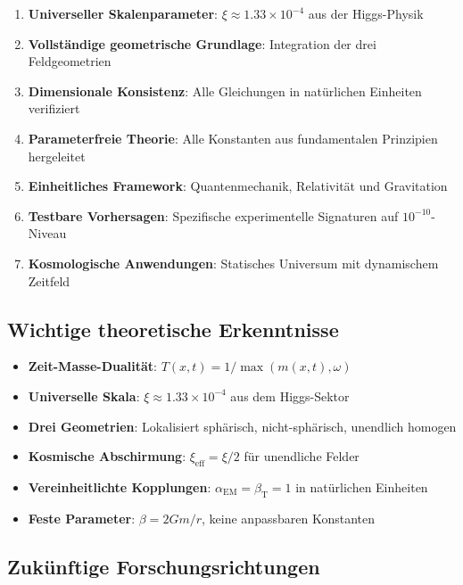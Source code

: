\documentclass[12pt,a4paper]{article}
\newcommand{\betaT}{\beta_{\text{T}}}
\newcommand{\alphaEM}{\alpha_{\text{EM}}}
\newcommand{\xipar}{\xi}
\theoremstyle{definition}
\theoremstyle{remark}
\begin{document}
	\begin{enumerate}
		\item \textbf{Universeller Skalenparameter}: $\xi \approx 1.33 \times 10^{-4}$ aus der Higgs-Physik
		\item \textbf{Vollständige geometrische Grundlage}: Integration der drei Feldgeometrien
		\item \textbf{Dimensionale Konsistenz}: Alle Gleichungen in natürlichen Einheiten verifiziert
		\item \textbf{Parameterfreie Theorie}: Alle Konstanten aus fundamentalen Prinzipien hergeleitet
		\item \textbf{Einheitliches Framework}: Quantenmechanik, Relativität und Gravitation
		\item \textbf{Testbare Vorhersagen}: Spezifische experimentelle Signaturen auf $10^{-10}$-Niveau
		\item \textbf{Kosmologische Anwendungen}: Statisches Universum mit dynamischem Zeitfeld
	\end{enumerate}
	
	\subsection{Wichtige theoretische Erkenntnisse}
	\label{subsec:wichtige_erkenntnisse}
	
	\begin{tcolorbox}[colback=green!5!white,colframe=green!75!black,title=T0-Modell: Zentrale mathematische Ergebnisse]
		\begin{itemize}
			\item \textbf{Zeit-Masse-Dualität}: $T(x,t) = 1/\max(m(x,t), \omega)$
			\item \textbf{Universelle Skala}: $\xipar \approx 1.33 \times 10^{-4}$ aus dem Higgs-Sektor
			\item \textbf{Drei Geometrien}: Lokalisiert sphärisch, nicht-sphärisch, unendlich homogen
			\item \textbf{Kosmische Abschirmung}: $\xi_{\text{eff}} = \xipar/2$ für unendliche Felder
			\item \textbf{Vereinheitlichte Kopplungen}: $\alphaEM = \betaT = 1$ in natürlichen Einheiten
			\item \textbf{Feste Parameter}: $\beta = 2Gm/r$, keine anpassbaren Konstanten
		\end{itemize}
	\end{tcolorbox}
	
	\subsection{Zukünftige Forschungsrichtungen}
	\label{subsec:zukuenftige_richtungen}
	
\end{document}
